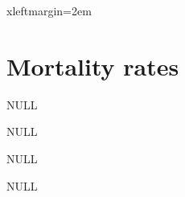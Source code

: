 \documentclass{article}
\begin{document}


 {xleftmargin=2em}
\renewenvironment{Schunk}{\vspace{\topsep}}{\vspace{\topsep}}


\section*{Mortality rates}




\begin{Schunk}
\begin{Soutput}
NULL
\end{Soutput}
\end{Schunk}


\begin{Schunk}
\begin{Soutput}
NULL
\end{Soutput}
\end{Schunk}




\begin{Schunk}
\begin{Soutput}
NULL
\end{Soutput}
\end{Schunk}


\begin{Schunk}
\begin{Soutput}
NULL
\end{Soutput}
\end{Schunk}


\end{document}

